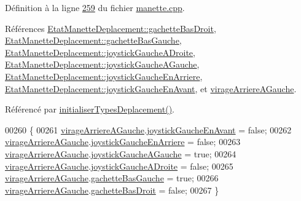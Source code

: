 Définition à la ligne \hyperlink{manette_8cpp_source_l00259}{259} du fichier \hyperlink{manette_8cpp_source}{manette.\+cpp}.



Références \hyperlink{manette_8h_source_l00185}{Etat\+Manette\+Deplacement\+::gachette\+Bas\+Droit}, \hyperlink{manette_8h_source_l00184}{Etat\+Manette\+Deplacement\+::gachette\+Bas\+Gauche}, \hyperlink{manette_8h_source_l00183}{Etat\+Manette\+Deplacement\+::joystick\+Gauche\+A\+Droite}, \hyperlink{manette_8h_source_l00182}{Etat\+Manette\+Deplacement\+::joystick\+Gauche\+A\+Gauche}, \hyperlink{manette_8h_source_l00181}{Etat\+Manette\+Deplacement\+::joystick\+Gauche\+En\+Arriere}, \hyperlink{manette_8h_source_l00180}{Etat\+Manette\+Deplacement\+::joystick\+Gauche\+En\+Avant}, et \hyperlink{manette_8h_source_l00239}{virage\+Arriere\+A\+Gauche}.



Référencé par \hyperlink{manette_8cpp_source_l00085}{initialiser\+Types\+Deplacement()}.


\begin{DoxyCode}
00260 \{
00261     \hyperlink{class_manette_a92a64ea372e58825097e049694e838a1}{virageArriereAGauche}.\hyperlink{struct_etat_manette_deplacement_a8c8e3ca694408bc6a6ced4e20b9da0be}{joystickGaucheEnAvant} = \textcolor{keyword}{false};
00262     \hyperlink{class_manette_a92a64ea372e58825097e049694e838a1}{virageArriereAGauche}.\hyperlink{struct_etat_manette_deplacement_a584cf1538425c87588c5b96b79c8d482}{joystickGaucheEnArriere} = \textcolor{keyword}{false};
00263     \hyperlink{class_manette_a92a64ea372e58825097e049694e838a1}{virageArriereAGauche}.\hyperlink{struct_etat_manette_deplacement_af7e92a8d8f116e2bc4a5a95386f604e7}{joystickGaucheAGauche} = \textcolor{keyword}{true};
00264     \hyperlink{class_manette_a92a64ea372e58825097e049694e838a1}{virageArriereAGauche}.\hyperlink{struct_etat_manette_deplacement_a8fa93da5af430ac00ffd4ee8b76987a2}{joystickGaucheADroite} = \textcolor{keyword}{false};
00265     \hyperlink{class_manette_a92a64ea372e58825097e049694e838a1}{virageArriereAGauche}.\hyperlink{struct_etat_manette_deplacement_a0d197e25bc2e0402a068a8d012c25472}{gachetteBasGauche} = \textcolor{keyword}{true};
00266     \hyperlink{class_manette_a92a64ea372e58825097e049694e838a1}{virageArriereAGauche}.\hyperlink{struct_etat_manette_deplacement_a4588620c1e2a3543ce67c9a791aac106}{gachetteBasDroit} = \textcolor{keyword}{false};
00267 \}
\end{DoxyCode}
\mbox{\label{class_manette_ad41918ccfeee9d80146a74678173cee8}} 
